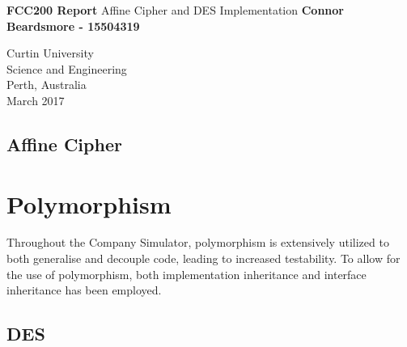 \documentclass[]{article}
\begin{document}

\begin{titlepage}
	\begin{center}
		\vspace*{1cm}
		\LARGE\textbf{FCC200 Report}
		\break
		Affine Cipher and DES Implementation
		\vspace{1cm}
		\break
		\Large\textbf{Connor Beardsmore - 15504319} 
		\vspace{15cm}

		\normalsize
		Curtin University \\
		Science and Engineering \\
		Perth, Australia \\
	    March 2017
	    
	\end{center}
\end{titlepage}


\vspace*{-0.8cm}
\begin{center}
	\section*{Affine Cipher}
\end{center}


\vspace*{0.8cm}
\section*{Polymorphism}

Throughout the Company Simulator, polymorphism is extensively utilized to both generalise and decouple code, leading to increased testability. To allow for the use of polymorphism, both implementation inheritance and interface inheritance has been employed. \\

\break

\vspace*{-0.8cm}
\begin{center}
	\section*{DES}
\end{center}

\end{document}
